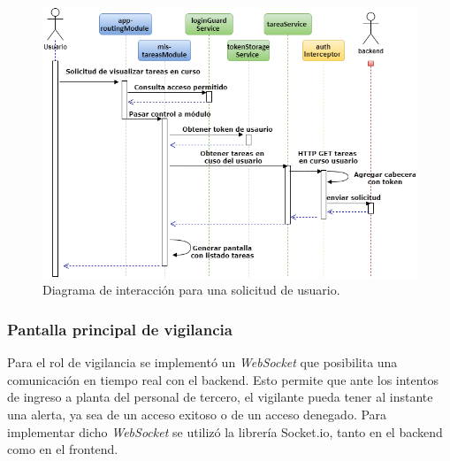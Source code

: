 \begin{figure}[ht]
	\centering
	\includegraphics[width=1\textwidth]{./Figures/UsuarioPedidoInteraccion.png}
	\caption{Diagrama de interacción para una solicitud de usuario.}
	\label{fig:UsuarioPedidoInteraccion}
\end{figure}

\pagebreak
\subsubsection{Pantalla principal de vigilancia}

Para el rol de vigilancia se implementó un \textit{WebSocket} que posibilita una comunicación en tiempo real con el backend. Esto permite que ante los intentos de ingreso a planta del personal de tercero, el vigilante pueda tener al instante una alerta, ya sea de un acceso exitoso o de un acceso denegado. Para implementar dicho \textit{WebSocket} se utilizó la librería Socket.io, tanto en el backend como en el frontend. 

